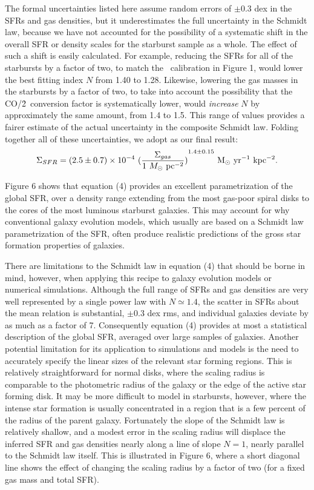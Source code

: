 The formal uncertainties listed here assume random
errors of $\pm$0.3 dex in the SFRs and gas densities, but it 
underestimates the full uncertainty in the Schmidt
law, because we have not accounted for the possibility of a
systematic shift in the overall SFR or density scales for the starburst
sample as a whole.  The effect of such a shift is easily calculated. 
For example, reducing the SFRs for all of
the starbursts by a factor of two, to match the \brgamma\ calibration in
Figure 1, would lower the best fitting index $N$ from 1.40 to 1.28.  
Likewise, lowering the gas masses in the starbursts by a factor of two, 
to take into account the possibility that the CO/\h2\ conversion factor is 
systematically lower, would {\it increase} $N$ 
by approximately the same amount, from 1.4 to 1.5.  This range of values
provides a fairer estimate of the actual uncertainty in the composite
Schmidt law.  Folding together all of these uncertainties, 
we adopt as our final result:
\begin{equation}
 {\Sigma_{SFR}} = {(2.5 \pm 0.7) \times 10^{-4}}~{{ ({{\Sigma_{gas}} \over 
 {1~M_{\odot}~{\rm pc}^{-2}}})}^{1.4 \pm 0.15}}~
  {{\rm M_{\odot}~yr^{-1}~kpc^{-2}}}  .
\end{equation}

Figure 6 shows that equation (4) provides an excellent parametrization 
of the global SFR, over a density range
extending from the most gas-poor spiral disks to the cores of the most
luminous starburst galaxies.  This may account for why 
conventional galaxy evolution models, which usually are based on a 
Schmidt law parametrization of the SFR, often produce realistic 
predictions of the gross star formation properties of galaxies.

There are limitations to the Schmidt law in equation (4) that should
be borne in mind, however, 
when applying this recipe to galaxy evolution models
or numerical simulations.  Although the full range of SFRs and gas densities
are very well represented by a single power law with $N \simeq 1.4$,
the scatter in SFRs about the mean relation is substantial,
$\pm$0.3 dex rms, and individual galaxies deviate by as much as
a factor of 7.  Consequently equation (4) provides at most a statistical 
description of the global SFR, averaged over large samples of galaxies.
Another potential limitation for its application to simulations and  
models is the need to accurately specify the linear sizes of
the relevant star forming regions.  This is relatively straightforward
for normal disks, where the scaling radius is comparable to the photometric
radius of the galaxy or the edge of the active star forming disk.
It may be more difficult to model in starbursts, however, where the 
intense star formation is usually concentrated in a region that is a 
few percent of the radius of the parent galaxy.  Fortunately 
the slope of the Schmidt law is relatively shallow,
and a modest error in the scaling radius will displace the inferred SFR and
gas densities nearly along a line of slope $N = 1$, nearly parallel
to the Schmidt law itself.  This is illustrated 
in Figure 6, where a short diagonal line shows the effect of changing
the scaling radius by a factor of two (for a fixed gas mass and total SFR).

